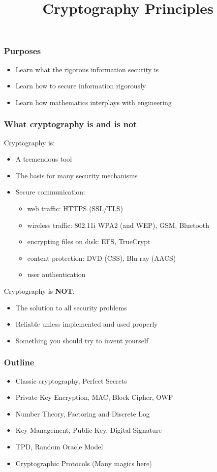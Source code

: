 

\title{Cryptography Principles}


\maketitle
\begin{frame}\frametitle{Purposes}
\begin{itemize}
\item Learn what the rigorous information security is
\item Learn how to secure information rigorously
\item Learn how mathematics interplays with engineering
\end{itemize}
\end{frame}
\begin{frame}\frametitle{What cryptography is and is not}
Cryptography is:
\begin{itemize}
\item A tremendous tool
\item The basis for many security mechanisms
\item Secure communication: 
\begin{itemize}
\item web traffic: HTTPS (SSL/TLS)
\item wireless traffic: 802.11i WPA2 (and WEP), GSM, Bluetooth
\item encrypting files on disk: EFS, TrueCrypt
\item content protection: DVD (CSS), Blu-ray (AACS)
\item user authentication
\end{itemize}
\end{itemize}
Cryptography is \textbf{NOT}:
\begin{itemize}
\item The solution to all security problems
\item Reliable unless implemented and used properly
\item Something you should try to invent yourself	
\end{itemize}
\end{frame}
\begin{frame}\frametitle{Outline}
\begin{itemize}
\item Classic cryptography, Perfect Secrets
\item Private Key Encryption, MAC, Block Cipher, OWF
\item Number Theory, Factoring and Discrete Log
\item Key Management, Public Key, Digital Signature
\item TPD, Random Oracle Model
\item Cryptographic Protocols (Many magics here)
\end{itemize}	
\end{frame}
